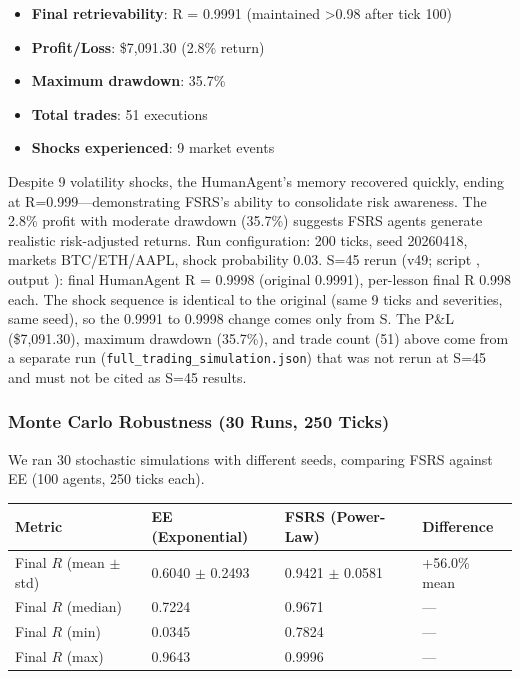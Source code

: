 \documentclass[11pt]{article}
\begin{document}
\begin{itemize}
\item \textbf{Final retrievability}: R = 0.9991 (maintained >0.98 after tick 100)
\item \textbf{Profit/Loss}: \$7,091.30 (2.8\% return)
\item \textbf{Maximum drawdown}: 35.7\%
\item \textbf{Total trades}: 51 executions
\item \textbf{Shocks experienced}: 9 market events
\end{itemize}

Despite 9 volatility shocks, the HumanAgent's memory recovered quickly, ending at R=0.999---demonstrating FSRS's ability to consolidate risk awareness. The 2.8\% profit with moderate drawdown (35.7\%) suggests FSRS agents generate realistic risk-adjusted returns. Run configuration: 200 ticks, seed 20260418, markets BTC/ETH/AAPL, shock probability 0.03. S=45 rerun (v49; script , output ): final HumanAgent R = 0.9998 (original 0.9991), per-lesson final R 0.998 each. The shock sequence is identical to the original (same 9 ticks and severities, same seed), so the 0.9991 to 0.9998 change comes only from S. The P\&L (\$7,091.30), maximum drawdown (35.7\%), and trade count (51) above come from a separate run (\texttt{full\_trading\_simulation.json}) that was not rerun at S=45 and must not be cited as S=45 results.

\subsubsection{Monte Carlo Robustness (30 Runs, 250 Ticks)}
We ran 30 stochastic simulations with different seeds, comparing FSRS against EE (100 agents, 250 ticks each).

\begin{table}[htbp]
\centering
\begin{tabular}{llll}
\toprule
\textbf{Metric} & \textbf{EE (Exponential)} & \textbf{FSRS (Power-Law)} & \textbf{Difference} \\
\midrule
Final $R$ (mean $\pm$ std) & 0.6040 $\pm$ 0.2493 & 0.9421 $\pm$ 0.0581 & +56.0\% mean \\
Final $R$ (median) & 0.7224 & 0.9671 & --- \\
Final $R$ (min) & 0.0345 & 0.7824 & --- \\
Final $R$ (max) & 0.9643 & 0.9996 & --- \\
\bottomrule
\end{tabular}
\end{table}
\end{document}
